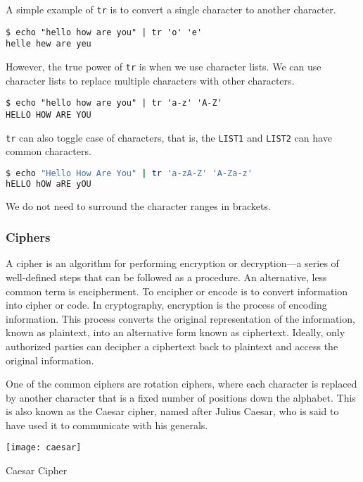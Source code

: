 A simple example of \lstinline|tr| is to convert a single character to another character.

\begin{lstlisting}
$ echo "hello how are you" | tr 'o' 'e'
helle hew are yeu
\end{lstlisting}

However, the true power of \lstinline|tr| is when we use character lists. We can use character lists to replace multiple characters with other characters.

\begin{lstlisting}
$ echo "hello how are you" | tr 'a-z' 'A-Z'
HELLO HOW ARE YOU
\end{lstlisting}

\lstinline|tr| can also toggle case of characters, that is, the \lstinline|LIST1| and \lstinline|LIST2| can have common characters.

\begin{lstlisting}[language=bash]
$ echo "Hello How Are You" | tr 'a-zA-Z' 'A-Za-z'
hELLO hOW aRE yOU
\end{lstlisting}

We do not need to surround the character ranges in brackets.

\subsubsection{Ciphers}

\begin{definition}[Cipher]
  A cipher is an algorithm for performing encryption or decryption—a series of well-defined steps that can be followed as a procedure. An alternative, less common term is encipherment. To encipher or encode is to convert information into cipher or code. In cryptography, encryption is the process of encoding information. This process converts the original representation of the information, known as plaintext, into an alternative form known as ciphertext. Ideally, only authorized parties can decipher a ciphertext back to plaintext and access the original information.
\end{definition}

One of the common ciphers are rotation ciphers, where each character is replaced by another character that is a fixed number of positions down the alphabet. This is also known as the Caesar cipher, named after Julius Caesar, who is said to have used it to communicate with his generals.

\begin{marginfigure}
  \texttt{[image: caesar]}
  \caption{Caesar Cipher}
\end{marginfigure}


